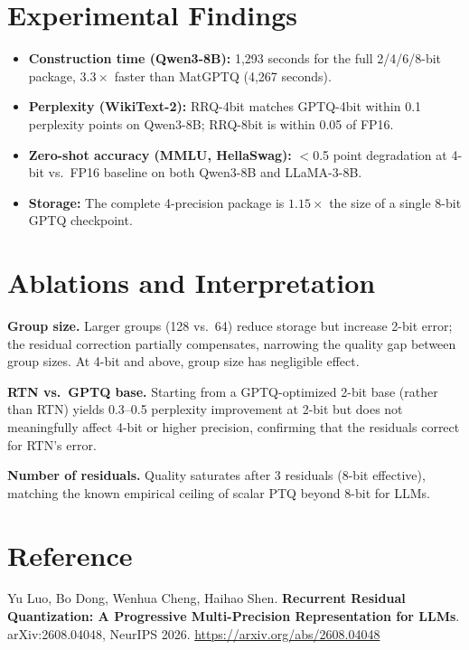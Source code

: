 \documentclass[10pt,twocolumn]{article}
\begin{document}
\section{Experimental Findings}

\begin{itemize}[itemsep=2pt,parsep=0pt]
  \item \textbf{Construction time (Qwen3-8B):} 1{,}293 seconds for the full
    2/4/6/8-bit package, $3.3\times$ faster than MatGPTQ (4{,}267 seconds).
  \item \textbf{Perplexity (WikiText-2):} RRQ-4bit matches GPTQ-4bit within
    0.1 perplexity points on Qwen3-8B; RRQ-8bit is within 0.05 of FP16.
  \item \textbf{Zero-shot accuracy (MMLU, HellaSwag):} $<$0.5 point degradation
    at 4-bit vs.\ FP16 baseline on both Qwen3-8B and LLaMA-3-8B.
  \item \textbf{Storage:} The complete 4-precision package is $1.15\times$ the
    size of a single 8-bit GPTQ checkpoint.
\end{itemize}

\section{Ablations and Interpretation}

\textbf{Group size.} Larger groups (128 vs.\ 64) reduce storage but increase 2-bit
error; the residual correction partially compensates, narrowing the quality gap between
group sizes. At 4-bit and above, group size has negligible effect.

\textbf{RTN vs.\ GPTQ base.} Starting from a GPTQ-optimized 2-bit base (rather than
RTN) yields 0.3--0.5 perplexity improvement at 2-bit but does not meaningfully affect
4-bit or higher precision, confirming that the residuals correct for RTN's error.

\textbf{Number of residuals.} Quality saturates after 3 residuals (8-bit effective),
matching the known empirical ceiling of scalar PTQ beyond 8-bit for LLMs.

\section*{Reference}

Yu Luo, Bo Dong, Wenhua Cheng, Haihao Shen.
\textbf{Recurrent Residual Quantization: A Progressive Multi-Precision Representation
for LLMs}. arXiv:2608.04048, NeurIPS 2026.
\url{https://arxiv.org/abs/2608.04048}
\end{document}
